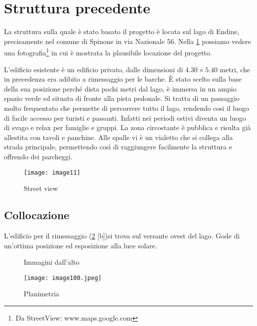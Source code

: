 \section{Struttura precedente}

La struttura sulla quale è stato basato il progetto è locata sul lago di Endine,  precisamente nel comune di Spinone in via Nazionale 56. Nella \cref{fig:streetview} possiamo vedere una fotografia\footnote{Da StreetView: www.maps.google.com} in cui è mostrata la plausibile locazione del progetto.

L'edificio esistente è un edificio privato, dalle dimensioni di $4.30 \times 5.40$ metri, che in precedenza era adibito a rimessaggio per le barche.  È stato scelto sulla base della sua posizione perché dista pochi metri dal lago, è immersa in un ampio spazio verde  ed situata di fronte alla pista pedonale. Si tratta di un passaggio molto frequentato  che permette di percorrere tutto il lago, rendendo cosi il luogo di facile accesso per turisti e passanti. Infatti nei periodi estivi diventa un luogo di svago e relax per famiglie e gruppi. La zona circostante è pubblica e risulta già allestita con tavoli e panchine. Alle spalle vi è un vialetto  che si collega alla strada principale, permettendo così di raggiungere facilmente la struttura e offrendo dei parcheggi.

\begin{figure}[H]
	\centering
	\texttt{[image: image11]}
	\caption{Street view}
	\label{fig:streetview}
\end{figure}

\clearpage
\subsection{Collocazione}

L'edificio per il rimessaggio (\cref{fig:rimessaggio} [b])si trova sul versante ovest del lago. Gode di un'ottima posizione ed esposizione alla luce solare.

\begin{figure}[H]
	\captionsetup[subfloat]{farskip=2pt,captionskip=8pt}
	\centering
	\hspace{1cm}
	
	\caption{Immagini dall'alto}
	\label{fig:rimessaggio}
\end{figure}


\begin{figure}[H]
	\centering
	\texttt{[image: image100.jpeg]}
	\caption{Planimetria} 
	\label{fig:mesh1}
\end{figure}